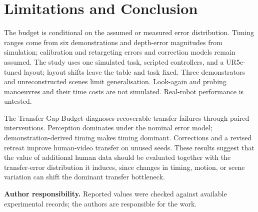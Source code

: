 \section{Limitations and Conclusion}
\label{sec:limits}

The budget is conditional on the assumed or measured error distribution. Timing ranges come from six demonstrations and depth-error magnitudes from simulation; calibration and retargeting errors and correction models remain assumed. The study uses one simulated task, scripted controllers, and a UR5e-tuned layout; layout shifts leave the table and task fixed. Three demonstrators and unreconstructed scenes limit generalisation. Look-again and probing manoeuvres and their time costs are not simulated. Real-robot performance is untested.

The Transfer Gap Budget diagnoses recoverable transfer failures through paired interventions. Perception dominates under the nominal error model; demonstration-derived timing makes timing dominant. Corrections and a revised retreat improve human-video transfer on unused seeds. These results suggest that the value of additional human data should be evaluated together with the transfer-error distribution it induces, since changes in timing, motion, or scene variation can shift the dominant transfer bottleneck.

\textbf{Author responsibility.} Reported values were checked against available experimental records; the authors are responsible for the work.

